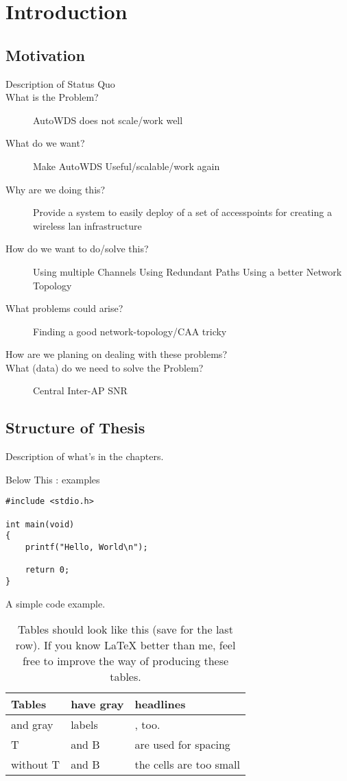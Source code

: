 \chapter{Introduction}
\section{Motivation}
\begin{description}
\item[Description of Status Quo]
\item[What is the Problem?]
AutoWDS does not scale/work well
\item[What do we want?]
Make AutoWDS Useful/scalable/work again
\item[Why are we doing this?]
Provide a system to easily deploy of a set of accesspoints for creating a wireless lan infrastructure
\item[How do we want to do/solve this?]
Using multiple Channels
Using Redundant Paths Using a better Network Topology
\item[What problems could arise?]
Finding a good network-topology/CAA tricky
\item[How are we planing on dealing with these problems?]
\item[What (data) do we need to solve the Problem?]
Central Inter-AP SNR
\end{description}

\section{Structure of Thesis}
Description of what's in the chapters.

Below This : examples

\begin{listing}[t]
\begin{lstlisting}
#include <stdio.h>

int main(void)
{
	printf("Hello, World\n");

	return 0;
}
\end{lstlisting}
\caption{A simple code example.}
\label{lst:example}
\end{listing}


\begin{table}[b]
\caption{Tables should look like this (save for the last row). If you know LaTeX better than me, feel free to improve the way of producing these tables.}
\begin{tabularx}{\linewidth}{|l|X|X|}
\hline
\rowcolor{slightgray}
\T Tables	&have gray  &headlines\\
\hline
\cellcolor{slightgray}\T and gray &labels \B&, too.\\
\hline
\cellcolor{slightgray}\T T &and B& are used for spacing\B\\
\hline
\cellcolor{slightgray} without T & and B& the cells are too small\B\\
\hline 
\end{tabularx}
\label{tab:example}
\end{table}

